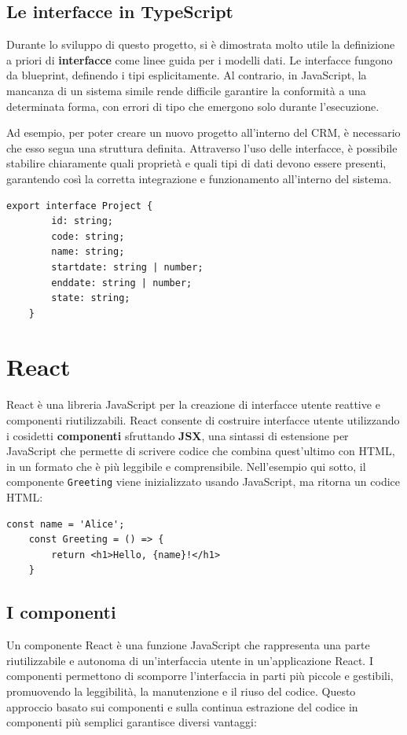 \documentclass[target=bach,aauheader=,style=]{thud}
\begin{document}
\subsection{Le interfacce in TypeScript}
Durante lo sviluppo di questo progetto, si è dimostrata molto utile la definizione a priori di \textbf{interfacce} come linee guida per i modelli dati. Le interfacce fungono da blueprint, definendo i tipi esplicitamente. Al contrario, in JavaScript, la mancanza di un sistema simile rende difficile garantire la conformità a una determinata forma, con errori di tipo che emergono solo durante l'esecuzione.

\noindent Ad esempio, per poter creare un nuovo progetto all'interno del CRM, è necessario che esso segua una struttura definita. Attraverso l'uso delle interfacce, è possibile stabilire chiaramente quali proprietà e quali tipi di dati devono essere presenti, garantendo così la corretta integrazione e funzionamento all'interno del sistema.

\begin{lstlisting}[language=React, caption=Interfaccia di progetto]
    export interface Project {
        id: string;
        code: string;
        name: string;
        startdate: string | number;
        enddate: string | number;
        state: string;
    }
\end{lstlisting}

\section{React}
React è una libreria JavaScript per la creazione di interfacce utente reattive e componenti riutilizzabili. React consente di costruire interfacce utente utilizzando i cosidetti \textbf{componenti} sfruttando \textbf{JSX}, una sintassi di estensione per JavaScript che permette di scrivere codice che combina quest'ultimo con HTML, in un formato che è più leggibile e comprensibile. Nell'esempio qui sotto,  il componente \texttt{Greeting} viene inizializzato usando JavaScript, ma ritorna un codice HTML:

\begin{lstlisting}[language=React, caption=Esempio di codice React]
    const name = 'Alice';   
    const Greeting = () => {
        return <h1>Hello, {name}!</h1>
    } 
\end{lstlisting}

\subsection{I componenti}
Un componente React è una funzione JavaScript che rappresenta una parte riutilizzabile e autonoma di un'interfaccia utente in un'applicazione React. I componenti permettono di scomporre l'interfaccia in parti più piccole e gestibili, promuovendo la leggibilità, la manutenzione e il riuso del codice. Questo approccio basato sui componenti e sulla continua estrazione del codice in componenti più semplici garantisce diversi vantaggi:
\end{document}
